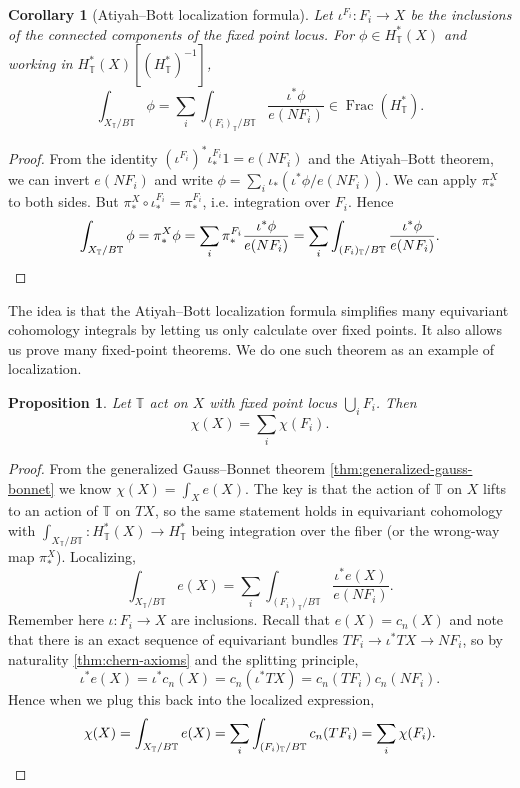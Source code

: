 \documentclass{report}
\theoremstyle{plain}
\newtheorem{proposition}[theorem]{Proposition}
\newtheorem{corollary}[theorem]{Corollary}
\theoremstyle{definition}
\theoremstyle{remark}
\newcommand{\bT}{\mathbb{T}}
\DeclareMathOperator{\Frac}{Frac}
\begin{document}
\begin{corollary}[Atiyah--Bott localization formula] \label{thm:equiv-localization}
  Let $\iota^{F_i}\colon F_i \to X$ be the inclusions of the connected
  components of the fixed point locus. For $\phi \in H_{\bT}^*(X)$
  and working in $H^*_{\bT}(X)[(H^*_{\bT})^{-1}]$,
  \[ \int_{X_{\bT}/B\bT} \phi = \sum_i \int_{(F_i)_{\bT}/B\bT} \frac{\iota^* \phi}{e(NF_i)} \in \Frac(H^*_{\bT}). \]
\end{corollary}

\begin{proof}
  From the identity $(\iota^{F_i})^* \iota^{F_i}_* 1 = e(NF_i)$ and
  the Atiyah--Bott theorem, we can invert $e(NF_i)$ and write $\phi =
  \sum_i \iota_*(\iota^* \phi/e(NF_i))$. We can apply $\pi^X_*$ to
  both sides. But $\pi^X_* \circ \iota^{F_i}_* = \pi^{F_i}_*$, i.e.
  integration over $F_i$. Hence
  \[ \int_{X_{\bT}/B\bT} \phi = \pi^X_*\phi = \sum_i \pi^{F_i}_* \frac{\iota^*\phi}{e(NF_i)} = \sum_i \int_{(F_i)_{\bT}/B\bT} \frac{\iota^*\phi}{e(NF_i)}. \qedhere \]
\end{proof}

The idea is that the Atiyah--Bott localization formula simplifies many
equivariant cohomology integrals by letting us only calculate over
fixed points. It also allows us prove many fixed-point theorems. We do
one such theorem as an example of localization.

\begin{proposition}
  Let $\bT$ act on $X$ with fixed point locus $\bigcup_i F_i$. Then
  \[ \chi(X) = \sum_i \chi(F_i). \]
\end{proposition}

\begin{proof}
  From the generalized Gauss--Bonnet theorem
  \ref{thm:generalized-gauss-bonnet} we know $\chi(X) = \int_X e(X)$.
  The key is that the action of $\bT$ on $X$ lifts to an action of
  $\bT$ on $TX$, so the same statement holds in equivariant cohomology
  with $\int_{X_{\bT}/B\bT}\colon H^*_{\bT}(X) \to H^*_{\bT}$ being
  integration over the fiber (or the wrong-way map $\pi^X_*$).
  Localizing,
  \[ \int_{X_{\bT}/B\bT} e(X) = \sum_i \int_{(F_i)_{\bT}/B\bT} \frac{\iota^* e(X)}{e(NF_i)}. \]
  Remember here $\iota\colon F_i \to X$ are inclusions. Recall that
  $e(X) = c_n(X)$ and note that there is an exact sequence of
  equivariant bundles $TF_i \to \iota^* TX \to NF_i$, so by
  naturality \ref{thm:chern-axioms} and the splitting principle,
  \[ \iota^* e(X) = \iota^* c_n(X) = c_n(\iota^* TX) = c_n(TF_i) c_n(NF_i). \]
  Hence when we plug this back into the localized expression,
  \[ \chi(X) = \int_{X_{\bT}/B\bT} e(X) = \sum_i \int_{(F_i)_{\bT}/B\bT} c_n(TF_i) = \sum_i \chi(F_i). \qedhere \]
\end{proof}
\end{document}
